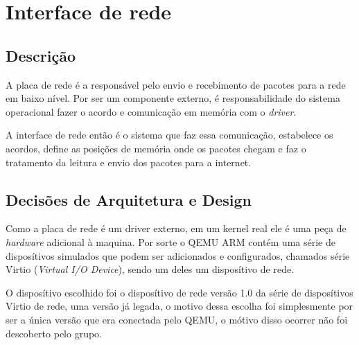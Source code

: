 \chapter{Interface de rede}


\section{Descrição}
%

A placa de rede é a responsável pelo envio e recebimento de pacotes para a rede em baixo nível. Por ser um componente externo, é responsabilidade do sistema operacional fazer o acordo e comunicação em memória com o \emph{driver}.

A interface de rede então é o sistema que faz essa comunicação, estabelece os acordos, define as posições de memória onde os pacotes chegam e faz o tratamento da leitura e envio dos pacotes para a internet.



\section{Decisões de Arquitetura e Design}
%
%

Como a placa de rede é um driver externo, em um kernel real ele é uma peça de \emph{hardware} adicional à maquina. Por sorte o QEMU ARM contém uma série de disposítivos simulados que podem ser adicionados e configurados, chamados série Virtio (\emph{Virtual I/O Device}), sendo um deles um disposítivo de rede.

O disposítivo escolhido foi o disposítivo de rede versão 1.0 da série de disposítivos Virtio de rede, uma versão já legada, o motivo dessa escolha foi simplesmente por ser a única versão que era conectada pelo QEMU, o mótivo disso ocorrer não foi descoberto pelo grupo.

